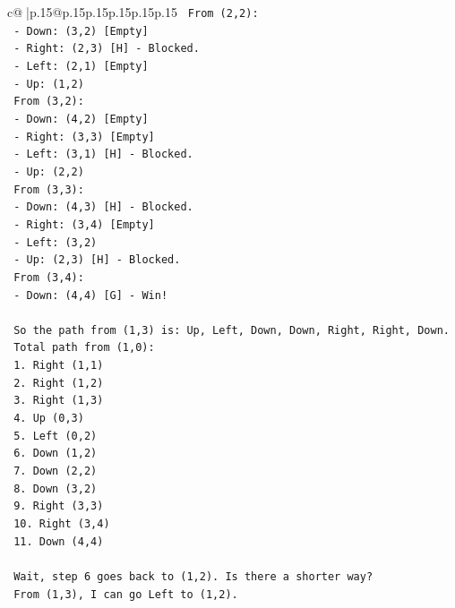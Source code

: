\documentclass{article}
\begin{document}
{\begin{supertabular}{c@{$\;$}|p{.15\linewidth}@{}p{.15\linewidth}p{.15\linewidth}p{.15\linewidth}p{.15\linewidth}p{.15\linewidth}}
{{{\texttt{   From (2,2):} \\
\texttt{     {-} Down: (3,2) {[}Empty{]}} \\
\texttt{     {-} Right: (2,3) {[}H{]} {-} Blocked.} \\
\texttt{     {-} Left: (2,1) {[}Empty{]}} \\
\texttt{     {-} Up: (1,2)} \\
\texttt{   From (3,2):} \\
\texttt{     {-} Down: (4,2) {[}Empty{]}} \\
\texttt{     {-} Right: (3,3) {[}Empty{]}} \\
\texttt{     {-} Left: (3,1) {[}H{]} {-} Blocked.} \\
\texttt{     {-} Up: (2,2)} \\
\texttt{   From (3,3):} \\
\texttt{     {-} Down: (4,3) {[}H{]} {-} Blocked.} \\
\texttt{     {-} Right: (3,4) {[}Empty{]}} \\
\texttt{     {-} Left: (3,2)} \\
\texttt{     {-} Up: (2,3) {[}H{]} {-} Blocked.} \\
\texttt{   From (3,4):} \\
\texttt{     {-} Down: (4,4) {[}G{]} {-} Win!} \\
\\ 
\texttt{   So the path from (1,3) is: Up, Left, Down, Down, Right, Right, Down.} \\
\texttt{   Total path from (1,0):} \\
\texttt{   1. Right (1,1)} \\
\texttt{   2. Right (1,2)} \\
\texttt{   3. Right (1,3)} \\
\texttt{   4. Up (0,3)} \\
\texttt{   5. Left (0,2)} \\
\texttt{   6. Down (1,2)} \\
\texttt{   7. Down (2,2)} \\
\texttt{   8. Down (3,2)} \\
\texttt{   9. Right (3,3)} \\
\texttt{   10. Right (3,4)} \\
\texttt{   11. Down (4,4)} \\
\\ 
\texttt{   Wait, step 6 goes back to (1,2). Is there a shorter way?} \\
\texttt{   From (1,3), I can go Left to (1,2).} \\
}}}
\end{supertabular}}
\end{document}
